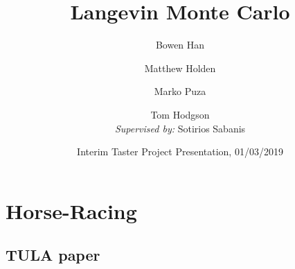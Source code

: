 \documentclass[aspectratio=169]{beamer}
\title{Langevin Monte Carlo}
\author{Bowen Han\inst{1} \and Matthew Holden\inst{1} \and Marko Puza\inst{1} \and Tom Hodgson\inst{1}\\ \textit{Supervised by:} Sotirios Sabanis\inst{2}}
\institute[Universities of Somewhere and Elsewhere] %
{
  \inst{1}%
    The Maxwell Institute Graduate School in Analysis \& its Applications
  \and
  \inst{2}%
  University of Edinburgh
}
\date{ Interim Taster Project Presentation, 01/03/2019}
\begin{document}
\begin{frame}
  \titlepage
\end{frame}


\section{Horse-Racing}


\subsection{TULA paper}
\end{document}
